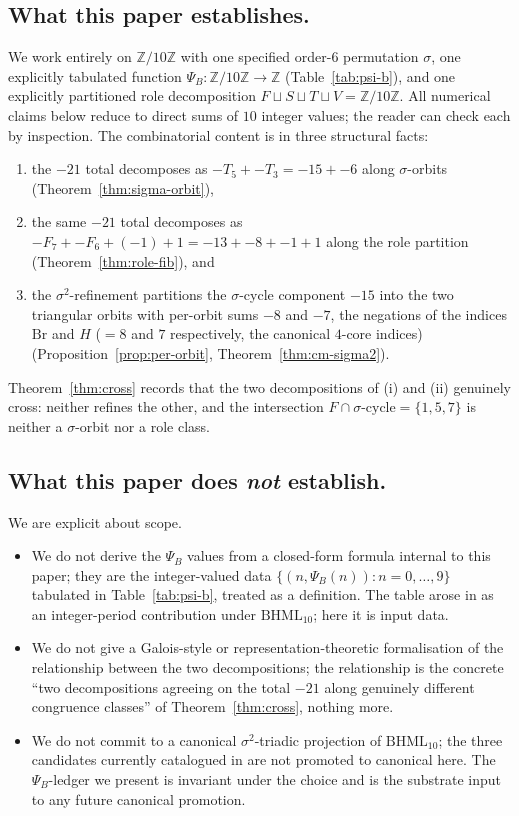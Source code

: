 \documentclass[11pt,reqno]{amsart}
\theoremstyle{plain}
\theoremstyle{definition}
\theoremstyle{remark}
\newcommand{\Z}{\mathbb{Z}}
\newcommand{\BH}{\mathrm{BHML}}
\newcommand{\sig}{\sigma}
\begin{document}
\subsection{What this paper establishes.}
We work entirely on $\Z/10\Z$ with one specified order-$6$ permutation
$\sig$, one explicitly tabulated function $\Psi_B : \Z/10\Z \to \Z$
(Table~\ref{tab:psi-b}), and one explicitly partitioned role
decomposition $F \sqcup S \sqcup T \sqcup V = \Z/10\Z$.
All numerical claims below reduce to direct sums of $10$ integer
values; the reader can check each by inspection.
The combinatorial content is in three structural facts:
\begin{enumerate}
\item the $-21$ total decomposes as $-T_5 + -T_3 = -15 + -6$ along
$\sig$-orbits (Theorem~\ref{thm:sigma-orbit}),
\item the same $-21$ total decomposes as $-F_7 + -F_6 + (-1) + 1
= -13 + -8 + -1 + 1$ along the role partition
(Theorem~\ref{thm:role-fib}), and
\item the $\sig^{2}$-refinement partitions the $\sig$-cycle component
$-15$ into the two triangular orbits with per-orbit sums
$-8$ and $-7$, the negations of the indices $\mathrm{Br}$ and $H$
($=8$ and $7$ respectively, the canonical $4$-core indices)
(Proposition~\ref{prop:per-orbit},
Theorem~\ref{thm:cm-sigma2}).
\end{enumerate}
Theorem~\ref{thm:cross} records that the two decompositions of (i) and
(ii) genuinely cross: neither refines the other, and the intersection
$F \cap \sig\text{-cycle} = \{1, 5, 7\}$ is neither a $\sig$-orbit nor
a role class.

\subsection{What this paper does \emph{not} establish.}
We are explicit about scope.
\begin{itemize}
\item We do not derive the $\Psi_B$ values from a closed-form formula
internal to this paper; they are the integer-valued data
$\{(n, \Psi_B(n)) : n = 0, \ldots, 9\}$ tabulated in
Table~\ref{tab:psi-b}, treated as a definition.  The table arose in
\cite{SandersBridgeWP9} as an integer-period contribution under
$\BH_{10}$; here it is input data.
\item We do not give a Galois-style or representation-theoretic
formalisation of the relationship between the two decompositions;
the relationship is the concrete ``two decompositions agreeing on
the total $-21$ along genuinely different congruence classes'' of
Theorem~\ref{thm:cross}, nothing more.
\item We do not commit to a canonical $\sig^{2}$-triadic projection of
$\BH_{10}$; the three candidates currently catalogued in
\cite{Atlas2026Tiering} are not promoted to canonical here.  The
$\Psi_B$-ledger we present is invariant under the choice and is the
substrate input to any future canonical promotion.
\end{itemize}
\end{document}
